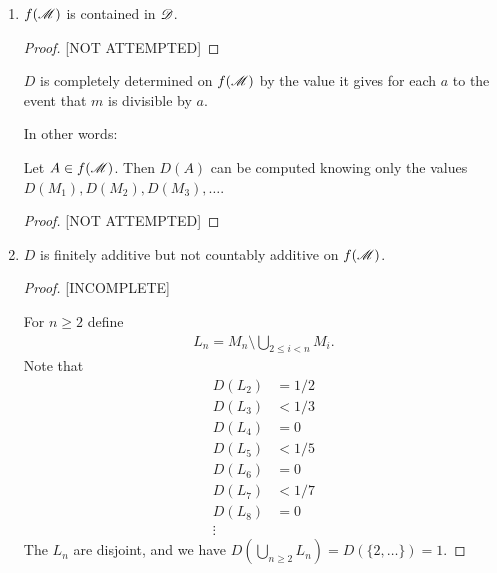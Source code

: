 \begin{enumerate}
\begin{enumerate}[label=(\alph*)]
\begin{enumerate}
\begin{proof}
         prove that $D(A) := \lim_{n\to\infty} P_n(A)$ does not exist.
      \end{proof}
    \item
      \begin{claim*}
        $\ms D$ is not closed under finite unions that are not disjoint.
      \end{claim*}
    \end{enumerate}

  \item
    \begin{claim*}
       $f(\mathscr M)$ is contained in $\ms D$.
    \end{claim*}
    \begin{proof}

      [NOT ATTEMPTED]
    \end{proof}
    \begin{claim*}
      $D$ is completely determined on $f(\mathscr M)$ by the value it gives for each $a$ to the event that $m$ is
      divisible by $a$.

      In other words:

      Let $A \in f(\mathscr M)$. Then $D(A)$ can be computed knowing only the values $D(M_1), D(M_2), D(M_3), \ldots$.
    \end{claim*}
    \begin{proof}

      [NOT ATTEMPTED]
    \end{proof}

  \item
    \begin{claim*}
      $D$ is finitely additive but not countably additive on $f(\mathscr M)$.
    \end{claim*}
    \begin{proof}

      [INCOMPLETE]

      For $n \geq 2$ define
      \begin{align*}
        L_n = M_n \setminus \bigcup_{2 \leq i < n} M_i.
      \end{align*}
      Note that
      \begin{align*}
        D(L_2) &= 1/2 \\
        D(L_3) &< 1/3 \\
        D(L_4) &= 0 \\
        D(L_5) &< 1/5 \\
        D(L_6) &= 0 \\
        D(L_7) &< 1/7 \\
        D(L_8) &= 0 \\
        \vdots
      \end{align*}
      The $L_n$ are disjoint, and we have $D(\bigcup_{n \geq 2} L_n) = D(\{2, \ldots\}) = 1$.


\end{proof}
\end{enumerate}
\end{enumerate}
